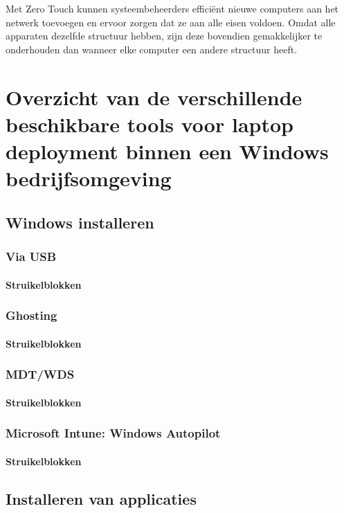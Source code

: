 Met Zero Touch kunnen systeembeheerders efficiënt nieuwe computers aan het netwerk toevoegen en ervoor zorgen dat ze aan alle eisen voldoen. Omdat alle apparaten dezelfde structuur hebben, zijn deze bovendien gemakkelijker te onderhouden dan wanneer elke computer een andere structuur heeft. \autocite{Goessens2020}

\section{Overzicht van de verschillende beschikbare tools voor laptop deployment binnen een Windows bedrijfsomgeving}

\subsection{Windows installeren}

\subsubsection{Via USB}
\paragraph*{Struikelblokken}
\subsubsection{Ghosting}
\paragraph*{Struikelblokken}
\subsubsection{MDT/WDS}
\paragraph*{Struikelblokken}
\subsubsection{Microsoft Intune: Windows Autopilot}
\paragraph*{Struikelblokken}

\subsection{Installeren van applicaties}

